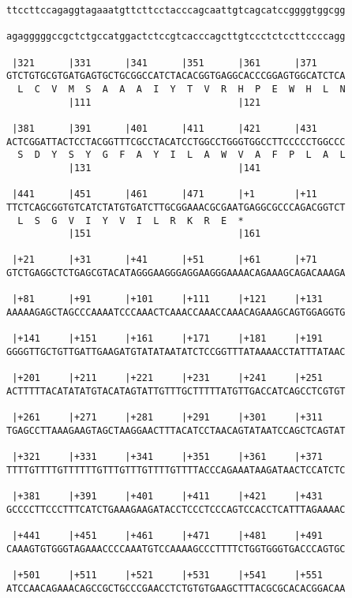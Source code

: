\documentclass{article}
\begin{document}
\begin{Verbatim}
ttccttccagaggtagaaatgttcttcctacccagcaattgtcagcatccggggtggcgg
                                                            
agagggggccgctctgccatggactctccgtcacccagcttgtccctctccttccccagg
                                                            
 |321      |331      |341      |351      |361      |371     
GTCTGTGCGTGATGAGTGCTGCGGCCATCTACACGGTGAGGCACCCGGAGTGGCATCTCA
  L  C  V  M  S  A  A  A  I  Y  T  V  R  H  P  E  W  H  L  N
           |111                          |121               
  
 |381      |391      |401      |411      |421      |431     
ACTCGGATTACTCCTACGGTTTCGCCTACATCCTGGCCTGGGTGGCCTTCCCCCTGGCCC
  S  D  Y  S  Y  G  F  A  Y  I  L  A  W  V  A  F  P  L  A  L
           |131                          |141               
  
 |441      |451      |461      |471      |+1       |+11     
TTCTCAGCGGTGTCATCTATGTGATCTTGCGGAAACGCGAATGAGGCGCCCAGACGGTCT
  L  S  G  V  I  Y  V  I  L  R  K  R  E  *                  
           |151                          |161
  
 |+21      |+31      |+41      |+51      |+61      |+71     
GTCTGAGGCTCTGAGCGTACATAGGGAAGGGAGGAAGGGAAAACAGAAAGCAGACAAAGA

 |+81      |+91      |+101     |+111     |+121     |+131    
AAAAAGAGCTAGCCCAAAATCCCAAACTCAAACCAAACCAAACAGAAAGCAGTGGAGGTG

 |+141     |+151     |+161     |+171     |+181     |+191    
GGGGTTGCTGTTGATTGAAGATGTATATAATATCTCCGGTTTATAAAACCTATTTATAAC

 |+201     |+211     |+221     |+231     |+241     |+251    
ACTTTTTACATATATGTACATAGTATTGTTTGCTTTTTATGTTGACCATCAGCCTCGTGT

 |+261     |+271     |+281     |+291     |+301     |+311    
TGAGCCTTAAAGAAGTAGCTAAGGAACTTTACATCCTAACAGTATAATCCAGCTCAGTAT

 |+321     |+331     |+341     |+351     |+361     |+371    
TTTTGTTTTGTTTTTTGTTTGTTTGTTTTGTTTTACCCAGAAATAAGATAACTCCATCTC

 |+381     |+391     |+401     |+411     |+421     |+431    
GCCCCTTCCCTTTCATCTGAAAGAAGATACCTCCCTCCCAGTCCACCTCATTTAGAAAAC

 |+441     |+451     |+461     |+471     |+481     |+491    
CAAAGTGTGGGTAGAAACCCCAAATGTCCAAAAGCCCTTTTCTGGTGGGTGACCCAGTGC

 |+501     |+511     |+521     |+531     |+541     |+551    
ATCCAACAGAAACAGCCGCTGCCCGAACCTCTGTGTGAAGCTTTACGCGCACACGGACAA


\end{Verbatim}
\end{document}
